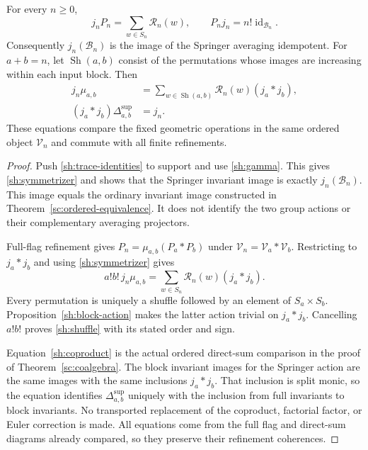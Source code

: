 \begin{theorem}\label{sh:operation-comparison}
For every $n\geq0$,
\begin{equation}\label{sh:symmetrizer}
 j_nP_n=\sum_{w\in S_n}\mathcal R_n(w),\qquad
 P_nj_n=n!\operatorname{id}_{\mathcal B_n}.
\end{equation}
Consequently $j_n(\mathcal B_n)$ is the image of the Springer
averaging idempotent. For $a+b=n$, let
$\operatorname{Sh}(a,b)$ consist of the permutations whose images
are increasing within each input block. Then
\begin{align}
 j_n\mu_{a,b}
   &=\sum_{w\in\operatorname{Sh}(a,b)}
           \mathcal R_n(w)(j_a*j_b),\label{sh:shuffle}\\
 (j_a*j_b)\Delta^{\mathrm{sup}}_{a,b}
   &=j_n.\label{sh:coproduct}
\end{align}
These equations compare the fixed geometric operations in the
same ordered object $\mathcal V_n$ and commute with all finite
refinements.
\end{theorem}
\begin{proof}
Push \eqref{sh:trace-identities} to support and use
\eqref{sh:gamma}. This gives \eqref{sh:symmetrizer} and shows
that the Springer invariant image is exactly $j_n(\mathcal B_n)$.
This image equals the ordinary invariant image constructed in
Theorem~\ref{sc:ordered-equivalence}. It does not identify the
two group actions or their complementary averaging projectors.

Full-flag refinement gives
$P_n=\mu_{a,b}(P_a*P_b)$ under
$\mathcal V_n=\mathcal V_a*\mathcal V_b$. Restricting to
$j_a*j_b$ and using \eqref{sh:symmetrizer} gives
\[
 a!b!\,j_n\mu_{a,b}
       =\sum_{w\in S_n}\mathcal R_n(w)(j_a*j_b).
\]
Every permutation is uniquely a shuffle followed by an element
of $S_a\times S_b$. Proposition~\ref{sh:block-action} makes
the latter action trivial on $j_a*j_b$. Cancelling $a!b!$
proves \eqref{sh:shuffle} with its stated order and sign.

Equation~\eqref{sh:coproduct} is the actual ordered direct-sum
comparison in the proof of Theorem~\ref{sc:coalgebra}. The
block invariant images for the Springer action are the same
images with the same inclusions $j_a*j_b$. That inclusion is
split monic, so the equation identifies
$\Delta^{\mathrm{sup}}_{a,b}$ uniquely with the inclusion from
full invariants to block invariants. No transported replacement
of the coproduct, factorial factor, or Euler correction is made.
All equations come from the full flag and direct-sum diagrams
already compared, so they preserve their refinement coherences.
\end{proof}


